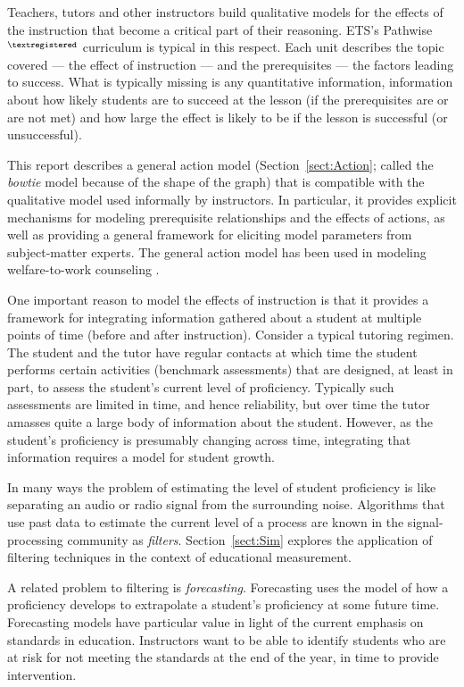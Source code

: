 \documentclass[12pt]{RR-article}
\begin{document}
Teachers, tutors and other instructors build qualitative models for
the effects of the instruction that become a critical part of their
reasoning.  ETS's Pathwise$^{\textregistered}$ curriculum is typical
in this respect.  Each unit describes the topic covered --- the effect
of instruction --- and the prerequisites --- the factors leading to
success.  What is typically missing is any quantitative information,
information about how likely students are to succeed at the lesson (if
the prerequisites are or are not met) and how large the effect is
likely to be if the lesson is successful (or unsuccessful).

This report describes a general action model
(Section~\ref{sect:Action}; called the \textit{bowtie} model because
of the shape of the graph) that is compatible with the qualitative
model used informally by instructors.  In particular, it provides
explicit mechanisms for modeling prerequisite relationships and the
effects of actions, as well as providing a general framework for
eliciting model parameters from subject-matter experts.  The general
action model has been used in modeling welfare-to-work counseling
\cite{bowties,WelfareToWorkIJAR}.

One important reason to model the effects of instruction is that it
provides a framework for integrating information gathered about a
student at multiple points of time (before and after instruction).
Consider a typical tutoring regimen.  The student and the tutor have
regular contacts at which time the student performs certain activities
(benchmark assessments) that are designed, at least in part, to assess
the student's current level of proficiency.  Typically such
assessments are limited in time, and hence reliability, but over time
the tutor amasses quite a large body of information about the student.
However, as the student's proficiency is presumably changing across
time, integrating that information requires a model for student
growth.

In many ways the problem of estimating the level of student
proficiency is like separating an audio or radio signal from the
surrounding noise.  Algorithms that use past data to estimate the
current level of a process are known in the signal-processing
community as {\it filters}.  Section~\ref{sect:Sim} explores
the application of filtering techniques in the context of educational
measurement. 

A related problem to filtering is \textit{forecasting}.  Forecasting
uses the model of how a proficiency develops to extrapolate a
student's proficiency at some future time.  Forecasting
models have particular value in light of the current emphasis on
standards in education.  Instructors want to be able to identify
students who are at risk for not meeting the standards at the end of
the year, in time to provide intervention.
\end{document}
